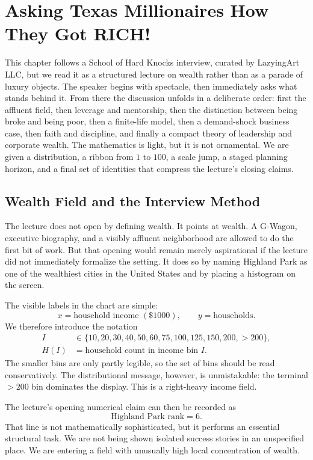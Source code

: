 \chapter{Asking Texas Millionaires How They Got RICH!}

This chapter follows a School of Hard Knocks interview, curated by LazyingArt LLC, but we read it as a structured lecture on wealth rather than as a parade of luxury objects. The speaker begins with spectacle, then immediately asks what stands behind it. From there the discussion unfolds in a deliberate order: first the affluent field, then leverage and mentorship, then the distinction between being broke and being poor, then a finite-life model, then a demand-shock business case, then faith and discipline, and finally a compact theory of leadership and corporate wealth. The mathematics is light, but it is not ornamental. We are given a distribution, a ribbon from \(1\) to \(100\), a scale jump, a staged planning horizon, and a final set of identities that compress the lecture's closing claims.

\section{Wealth Field and the Interview Method}

The lecture does not open by defining wealth. It points at wealth. A G-Wagon, executive biography, and a visibly affluent neighborhood are allowed to do the first bit of work. But that opening would remain merely aspirational if the lecture did not immediately formalize the setting. It does so by naming Highland Park as one of the wealthiest cities in the United States and by placing a histogram on the screen.

The visible labels in the chart are simple:
\begin{equation}
x=\text{household income }(\$1000),\qquad
y=\text{households}.
\end{equation}
We therefore introduce the notation
\begin{align}
I &\in \{10,20,30,40,50,60,75,100,125,150,200,>200\},\\
H(I) &= \text{household count in income bin } I.
\end{align}
The smaller bins are only partly legible, so the set of bins should be read conservatively. The distributional message, however, is unmistakable: the terminal \(>200\) bin dominates the display. This is a right-heavy income field.

The lecture's opening numerical claim can then be recorded as
\begin{equation}
\text{Highland Park rank}=6.
\end{equation}
That line is not mathematically sophisticated, but it performs an essential structural task. We are not being shown isolated success stories in an unspecified place. We are entering a field with unusually high local concentration of wealth.

